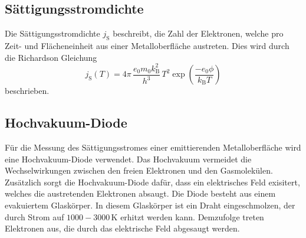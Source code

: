 \subsection{Sättigungsstromdichte}
\label{sec:Sättigungsstromdichte}
Die Sättigungsstromdichte $j_{\text{S}}$ beschreibt, die Zahl der Elektronen, welche pro Zeit- und Flächeneinheit
aus einer Metalloberfläche austreten. Dies wird durch die Richardson Gleichung
\begin{equation}
    j_{\text{S}}(T)= 4 \pi \,\frac{e_0 m_0 k_{\text{B}}^2}{h^3} \,T^2 \exp \left( \frac{-e_0 \phi}{k_{\text{B}}T}\right)
    \label{eqn:RichardsonGleichung}
\end{equation}
beschrieben. 

\subsection{Hochvakuum-Diode}
Für die Messung des Sättigungsstromes einer emittierenden Metalloberfläche wird eine Hochvakuum-Diode verwendet.
Das Hochvakuum vermeidet die Wechselwirkungen zwischen den freien Elektronen und den Gasmolekülen. Zusätzlich sorgt die 
Hochvakuum-Diode dafür, dass ein elektrisches Feld exisitert, welches die austretenden Elektronen absaugt.
Die Diode besteht aus einem evakuiertem Glaskörper. In diesem Glaskörper ist ein Draht eingeschmolzen, der durch Strom auf
$1000 - 3000\,\unit{\kelvin}$ erhitzt werden kann. Demzufolge treten Elektronen aus, die durch das elektrische Feld abgesaugt werden.


